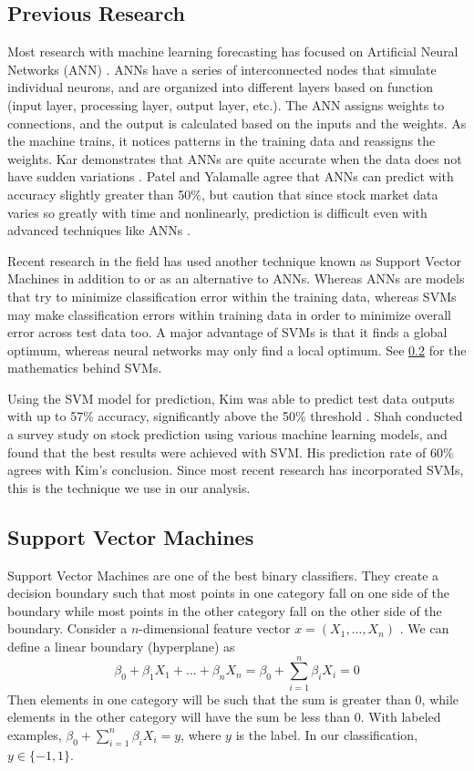 \documentclass[pageno]{jpaper}
\begin{document}
\subsection{Previous Research}
\label{subsec: previous}

Most research with machine learning forecasting has focused on Artificial Neural Networks (ANN) \cite{krollner}. ANNs have a series of interconnected nodes that simulate individual neurons, and are organized into different layers based on function (input layer, processing layer, output layer, etc.). The ANN assigns weights to connections, and the output is calculated based on the inputs and the weights. As the machine trains, it notices patterns in the training data and reassigns the weights. Kar demonstrates that ANNs are quite accurate when the data does not have sudden variations \cite{kar}. Patel and Yalamalle agree that ANNs can predict with accuracy slightly greater than 50\%, but caution that since stock market data varies so greatly with time and nonlinearly, prediction is difficult even with advanced techniques like ANNs \cite{patel}.

Recent research in the field has used another technique known as Support Vector Machines in addition to or as an alternative to ANNs. Whereas ANNs are models that try to minimize classification error within the training data, whereas SVMs may make classification errors within training data in order to minimize overall error across test data too. A major advantage of SVMs is that it finds a global optimum, whereas neural networks may only find a local optimum. See \ref{subsec: svm} for the mathematics behind SVMs.

Using the SVM model for prediction, Kim was able to predict test data outputs with up to 57\% accuracy, significantly above the 50\% threshold \cite{kim}. Shah conducted a survey study on stock prediction using various machine learning models, and found that the best results were achieved with SVM\cite{shah}. His prediction rate of 60\% agrees with Kim's conclusion. Since most recent research has incorporated SVMs, this is the technique we use in our analysis.

\subsection{Support Vector Machines}
\label{subsec: svm}

Support Vector Machines are one of the best binary classifiers. They create a decision boundary such that most points in one category fall on one side of the boundary while most points in the other category fall on the other side of the boundary. Consider a $n$-dimensional feature vector $x = (X_1, ..., X_n)$ \cite{halls-moore}. We can define a linear boundary (hyperplane) as 
$$\beta_0+\beta_1X_1+...+\beta_nX_n=\beta_0+\sum_{i=1}^n\beta_iX_i = 0$$
Then elements in one category will be such that the sum is greater than 0, while elements in the other category will have the sum be less than 0. With labeled examples, $\beta_0+\sum_{i=1}^n\beta_iX_i = y$, where $y$ is the label. In our classification, $y \in \{-1, 1\}$.
\end{document}
